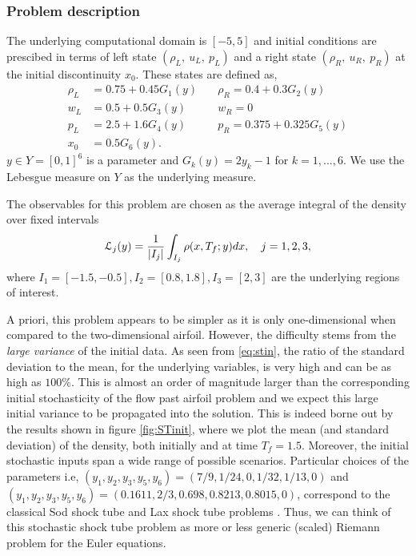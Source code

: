 \documentclass[a4paper]{article}
\numberwithin{equation}{section}
\numberwithin{equation}{section}
\theoremstyle{definition}
\theoremstyle{myremarkstyle}
\newcommand{\map}{\EuScript{L}}
\begin{document}
\subsubsection{Problem description}
The underlying computational domain is $[-5,5]$ and initial conditions are prescibed in terms of left state $ (\rho_L, \ u_L, \ p_L)$ and a right state $ (\rho_R, \ u_R, \ p_R)$ at the initial discontinuity $x_0$. These states are defined as,
\begin{equation}
    \label{eq:stin}
    \begin{aligned}
\rho_L&= 0.75+0.45G_1(y) \quad &\rho_R = 0.4 + 0.3G_2(y) \\
w_L&= 0.5+0.5G_3(y) \quad &w_R=0\\ 
p_L &=2.5+1.6G_4(y) \quad &p_R= 0.375+0.325G_5(y) \\
x_0 &= 0.5G_6(y).
\end{aligned}
\end{equation}
$y \in Y = [0,1]^6$ is a parameter and $G_k(y) = 2y_k-1$ for $k=1,...,6$. We use the Lebesgue measure on $Y$ as the underlying measure. 

The observables for this problem are chosen as the average integral of the density over fixed intervals
\begin{equation}\label{eq:sod_obs}
\map_j(y) = \frac{1}{|I_j|}\int_{I_j} \rho(x,T_f;y) dx, \quad j =1,2,3,
\end{equation}
where $I_1 = [-1.5,-0.5], I_2 = [0.8,1.8], I_3 = [2,3]$ are the underlying regions of interest. 

A priori, this problem appears to be simpler as it is only one-dimensional when compared to the two-dimensional airfoil. However, the difficulty stems from the \emph{large variance} of the initial data. As seen from \eqref{eq:stin}, the ratio of the standard deviation to the mean, for the underlying variables, is very high and can be as high as $100 \%$. This is almost an order of magnitude larger than the corresponding initial stochasticity of the flow past airfoil problem and we expect this large initial variance to be propagated into the solution. This is indeed borne out by the results shown in figure \ref{fig:STinit}, where we plot the mean (and standard deviation) of the density, both initially and at time $T_f = 1.5$. Moreover, the initial stochastic inputs span a wide range of possible scenarios. Particular choices of the parameters i.e, $(y_1,y_2,y_3,y_5,y_6) = (7/9,1/24,0,1/32,1/13,0)$ and $(y_1,y_2,y_3,y_5,y_6) = (0.1611,2/3,0.698,0.8213,0.8015,0)$, correspond to the classical Sod shock tube and Lax shock tube problems \cite{FMT}. Thus, we can think of this stochastic shock tube problem as more or less generic (scaled) Riemann problem for the Euler equations.    
\end{document}
